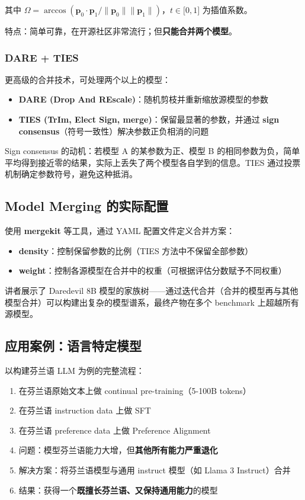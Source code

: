 \documentclass[a4paper]{article}
\begin{document}
其中 $\Omega = \arccos(\mathbf{p}_0 \cdot \mathbf{p}_1 / \|\mathbf{p}_0\| \|\mathbf{p}_1\|)$，$t \in {[}0, 1{]}$ 为插值系数。

特点：简单可靠，在开源社区非常流行；但\textbf{只能合并两个模型}。

\subsubsection{DARE + TIES}

更高级的合并技术，可处理两个以上的模型：

\begin{itemize}
    \item \textbf{DARE (Drop And REscale)}：随机剪枝并重新缩放源模型的参数
    \item \textbf{TIES (TrIm, Elect Sign, merge)}：保留最显著的参数，并通过 \textbf{sign consensus}（符号一致性）解决参数正负相消的问题
\end{itemize}

Sign consensus 的动机：若模型 A 的某参数为正、模型 B 的相同参数为负，简单平均得到接近零的结果，实际上丢失了两个模型各自学到的信息。TIES 通过投票机制确定参数符号，避免这种抵消。

\subsection{Model Merging 的实际配置}

使用 \textbf{mergekit} 等工具，通过 YAML 配置文件定义合并方案：

\begin{itemize}
    \item \textbf{density}：控制保留参数的比例（TIES 方法中不保留全部参数）
    \item \textbf{weight}：控制各源模型在合并中的权重（可根据评估分数赋予不同权重）
\end{itemize}

讲者展示了 Daredevil 8B 模型的家族树——通过迭代合并（合并的模型再与其他模型合并）可以构建出复杂的模型谱系，最终产物在多个 benchmark 上超越所有源模型。

\subsection{应用案例：语言特定模型}

以构建芬兰语 LLM 为例的完整流程：

\begin{enumerate}
    \item 在芬兰语原始文本上做 continual pre-training（5-100B tokens）
    \item 在芬兰语 instruction data 上做 SFT
    \item 在芬兰语 preference data 上做 Preference Alignment
    \item 问题：模型芬兰语能力大增，但\textbf{其他所有能力严重退化}
    \item 解决方案：将芬兰语模型与通用 instruct 模型（如 Llama 3 Instruct）合并
    \item 结果：获得一个\textbf{既擅长芬兰语、又保持通用能力}的模型
\end{enumerate}
\end{document}
